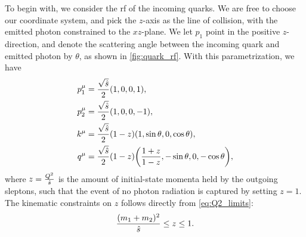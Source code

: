 To begin with, we consider the \gls{rf} of the incoming quarks.
We are free to choose our coordinate system, and pick the $z$-axis as the line of collision, with the emitted photon constrained to the $xz$-plane.
We let $p_1$ point in the positive $z$-direction, and denote the scattering angle between the incoming quark and emitted photon by $\theta$, as shown in \cref{fig:quark_rf}.
With this parametrization, we have
\begin{subequations}
\label{eq:momenta_quark_rf}
\begin{align}
    p_1^\mu &= \frac{\sqrt{\hat{s}}}{2} (1, 0, 0, 1),
    \label{eq:p1_quark_rf}
    \\
    p_2^\mu &= \frac{\sqrt{\hat{s}}}{2} (1, 0, 0, -1),
    \label{eq:p2_quark_rf}
    \\
    k^\mu &= \frac{\sqrt{\hat{s}}}{2}(1-z) (1, \sin\theta, 0, \cos\theta),
    \label{eq:k_quark_rf}
    \\
    q^\mu &= \frac{\sqrt{\hat{s}}}{2}(1-z) 
    \biggl(\frac{1+z}{1-z}, -\sin\theta, 0, -\cos\theta\biggr),
    \label{eq:q_quark_rf}
\end{align}
\end{subequations}
where $z=\frac{Q^2}{\hat{s}}$ is the amount of initial-state momenta held by the outgoing sleptons, such that the event of no photon radiation is captured by setting $z=1$. The kinematic constraints on $z$ follows directly from \cref{eq:Q2_limits}:
\begin{equation}
    \frac{(m_1+m_2)^2}{\hat{s}} \leq z \leq 1.
    \label{eq:z_limits}
\end{equation}

